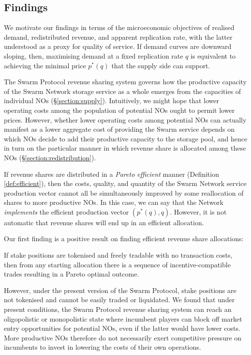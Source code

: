 
\subsection{Findings}

We motivate our findings in terms of the microeconomic objectives of realised demand, redistributed revenue, and apparent replication rate, with the latter understood as a proxy for quality of service.
%
If demand curves are downward sloping, then, maximising demand at a fixed replication rate $q$ is equivalent to achieving the minimal price $p^*(q)$ that the supply side can support.

The Swarm Protocol revenue sharing system governs how the productive capacity of the Swarm Network storage service as a whole emerges from the capacities of individual NOs (\S\ref{section:supply}).
%
Intuitively, we might hope that lower operating costs among the population of potential NOs ought to permit lower prices.
%
However, whether lower operating costs among potential NOs can actually manifest as a lower aggregate cost of providing the Swarm service depends on which NOs decide to add their productive capacity to the storage pool, and hence in turn on the particular manner in which revenue share is allocated among these NOs (\S\ref{section:redistribution}).

If revenue shares are distributed in a \emph{Pareto efficient} manner (Definition \ref{def:efficient}), then the costs, quality, and quantity of the Swarm Network service production vector cannot all be simultaneously improved by some reallocation of shares to more productive NOs.
%
In this case, we can say that the Network \emph{implements} the efficient production vector $(p^*(q),q)$.
%
However, it is not automatic that revenue shares will end up in an efficient allocation.

Our first finding is a positive result on finding efficient revenue share allocations:
%
\begin{theorem}
  
  If stake positions are tokenised and freely tradable with no transaction costs, then from any starting allocation there is a sequence of incentive-compatible trades resulting in a Pareto optimal outcome.

\end{theorem}

However, under the present version of the Swarm Protocol, stake positions are not tokenised and cannot be easily traded or liquidated.
%
We found that under present conditions, the Swarm Protocol revenue sharing system can reach an oligopolistic or monopolistic state where incumbent players can block off market entry opportunities for potential NOs, even if the latter would have lower costs.
%
More productive NOs therefore do not necessarily exert competitive pressure on incumbents to invest in lowering the costs of their own operations.

